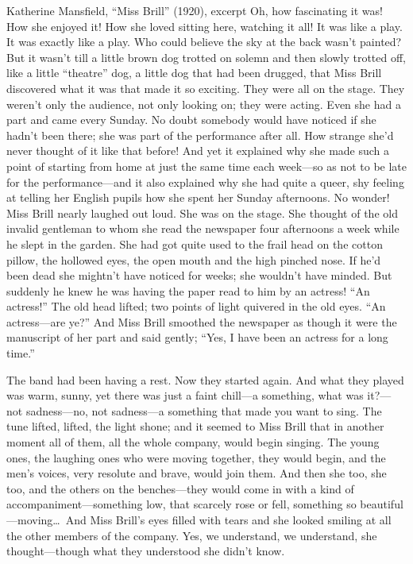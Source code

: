 \documentclass[11pt]{article}
\begin{document}
\begin{passage}{Katherine Mansfield, ``Miss Brill'' (1920), excerpt}{}
\pp Oh, how fascinating it was! How she enjoyed it! How she loved sitting here, watching it all! It was like a play. It was exactly like a play. Who could believe the sky at the back wasn't painted? But it wasn't till a little brown dog trotted on solemn and then slowly trotted off, like a little ``theatre'' dog, a little dog that had been drugged, that Miss Brill discovered what it was that made it so exciting. They were all on the stage. They weren't only the audience, not only looking on; they were acting. Even she had a part and came every Sunday. No doubt somebody would have noticed if she hadn't been there; she was part of the performance after all. How strange she'd never thought of it like that before! And yet it explained why she made such a point of starting from home at just the same time each week---so as not to be late for the performance---and it also explained why she had quite a queer, shy feeling at telling her English pupils how she spent her Sunday afternoons. No wonder! Miss Brill nearly laughed out loud. She was on the stage. She thought of the old invalid gentleman to whom she read the newspaper four afternoons a week while he slept in the garden. She had got quite used to the frail head on the cotton pillow, the hollowed eyes, the open mouth and the high pinched nose. If he'd been dead she mightn't have noticed for weeks; she wouldn't have minded. But suddenly he knew he was having the paper read to him by an actress! ``An actress!'' The old head lifted; two points of light quivered in the old eyes. ``An actress---are ye?'' And Miss Brill smoothed the newspaper as though it were the manuscript of her part and said gently; ``Yes, I have been an actress for a long time.''

\pp The band had been having a rest. Now they started again. And what they played was warm, sunny, yet there was just a faint chill---a something, what was it?---not sadness---no, not sadness---a something that made you want to sing. The tune lifted, lifted, the light shone; and it seemed to Miss Brill that in another moment all of them, all the whole company, would begin singing. The young ones, the laughing ones who were moving together, they would begin, and the men's voices, very resolute and brave, would join them. And then she too, she too, and the others on the benches---they would come in with a kind of accompaniment---something low, that scarcely rose or fell, something so beautiful---moving\ldots\ And Miss Brill's eyes filled with tears and she looked smiling at all the other members of the company. Yes, we understand, we understand, she thought---though what they understood she didn't know.


\end{passage}
\end{document}
